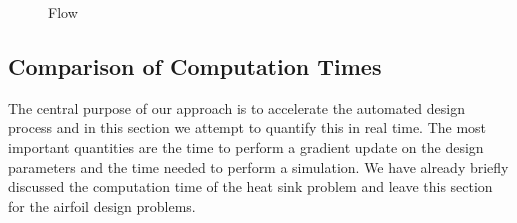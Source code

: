 \documentclass{article} %
\begin{document}
\begin{figure}[h]
\begin{center}
\end{center}
\caption{Flow}
\end{figure}

\subsection{Comparison of Computation Times}

The central purpose of our approach is to accelerate the automated design process and in this section we attempt to quantify this in real time. The most important quantities are the time to perform a gradient update on the design parameters and the time needed to perform a simulation. We have already briefly discussed the computation time of the heat sink problem and leave this section for the airfoil design problems.
\end{document}
